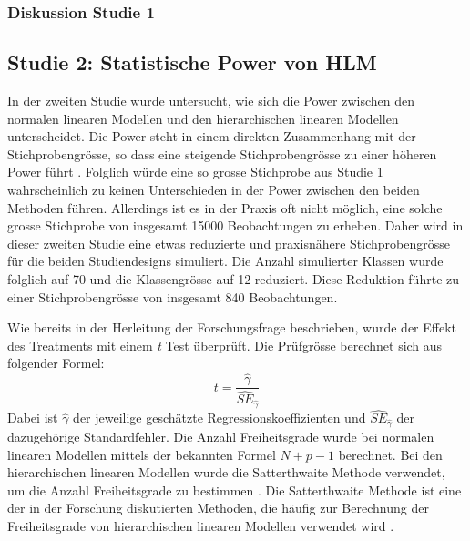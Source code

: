 \documentclass[12pt]{article}\usepackage[]{graphicx}\usepackage[]{color}
\begin{document}
\subsubsection{Diskussion Studie 1}









\subsection{Studie 2: Statistische Power von HLM}
In der zweiten Studie wurde untersucht, wie sich die Power zwischen den normalen linearen Modellen und den hierarchischen linearen Modellen unterscheidet. Die Power steht in einem direkten Zusammenhang mit der Stichprobengrösse, so dass eine steigende Stichprobengrösse zu einer höheren Power führt \citep{snijders2005samplesizepower}. Folglich würde eine so grosse Stichprobe aus Studie 1 wahrscheinlich zu keinen Unterschieden in der Power zwischen den beiden Methoden führen. Allerdings ist es in der Praxis oft nicht möglich, eine solche grosse Stichprobe von insgesamt 15000 Beobachtungen zu erheben. Daher wird in dieser zweiten Studie eine etwas reduzierte und praxisnähere Stichprobengrösse für die beiden Studiendesigns simuliert. Die Anzahl simulierter Klassen wurde folglich auf 70 und die Klassengrösse auf 12 reduziert. Diese Reduktion führte zu einer Stichprobengrösse von insgesamt 840 Beobachtungen. 

Wie bereits in der Herleitung der Forschungsfrage beschrieben, wurde der Effekt des Treatments mit einem \textit{t} Test überprüft. Die Prüfgrösse berechnet sich aus folgender Formel:
\begin{equation}
t = \dfrac{\widehat{\gamma}}{\widehat{SE}_{\widehat{\gamma}}}
\end{equation}
Dabei ist $\widehat{\gamma}$ der jeweilige geschätzte Regressionskoeffizienten und $\widehat{SE}_{\widehat{\gamma}}$ der dazugehörige Standardfehler. Die Anzahl Freiheitsgrade wurde bei normalen linearen Modellen mittels der bekannten Formel $N + p - 1$ berechnet. Bei den hierarchischen linearen Modellen wurde die Satterthwaite Methode verwendet, um die Anzahl Freiheitsgrade zu bestimmen \citeyearpar{satter1941synthesis}. Die Satterthwaite Methode ist eine der in der Forschung diskutierten Methoden, die häufig zur Berechnung der Freiheitsgrade von hierarchischen linearen Modellen verwendet wird \citep{raudenbush2002hierarchical,SnijdersTomA.B2012Ma:a}. 
\end{document}
